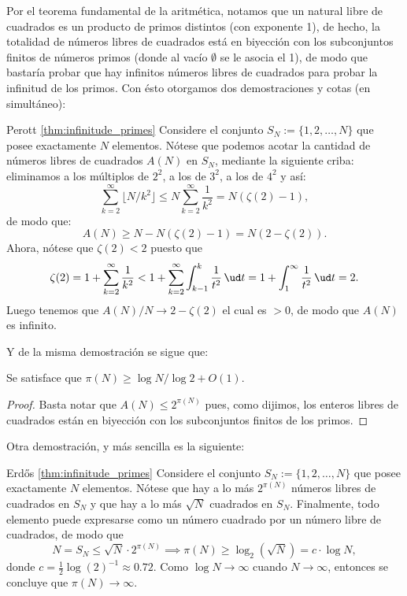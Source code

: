 \documentclass[teoria-numeros.tex]{subfiles}
\begin{document}
Por el teorema fundamental de la aritmética, notamos que un natural libre de cuadrados es un producto de primos distintos (con exponente 1),
de hecho, la totalidad de números libres de cuadrados está en biyección con los subconjuntos finitos de números primos (donde al vacío $\emptyset$
se le asocia el 1), de modo que bastaría probar que hay infinitos números libres de cuadrados para probar la infinitud de los primos.
Con ésto otorgamos dos demostraciones y cotas (en simultáneo):
\begin{Proof}{Perott \ref{thm:infinitude_primes}}
	Considere el conjunto $S_N := \{1, 2, \dots, N\}$ que posee exactamente $N$ elementos.
	Nótese que podemos acotar la cantidad de números libres de cuadrados $A(N)$ en $S_N$, mediante la siguiente criba:
	eliminamos a los múltiplos de $2^2$, a los de $3^2$, a los de $4^2$ y así:
	$$ \sum_{k=2}^{\infty} \lfloor N/k^2 \rfloor \le N \sum_{k=2}^{\infty} \frac{1}{k^2} = N( \zeta(2) - 1 ),  $$
	de modo que:
	$$ A(N) \ge N - N(\zeta(2) - 1) = N(2 - \zeta(2)). $$
	Ahora, nótese que $\zeta(2) < 2$ puesto que
	$$ \zeta(2) = 1 + \sum_{k=2}^{\infty} \frac{1}{k^2} < 1 + \sum_{k=2}^{\infty} \int_{k-1}^{k} \frac{1}{t^2} \, \ud t
	= 1 + \int_{1}^{\infty} \frac{1}{t^2} \, \ud t = 2. $$
	Luego tenemos que $A(N)/N \to 2 - \zeta(2)$ el cual es $>0$, de modo que $A(N)$ es infinito.
\end{Proof}

Y de la misma demostración se sigue que:
\begin{cor}
	Se satisface que $\pi(N) \ge \log N / \log 2 + O(1)$.
\end{cor}
\begin{proof}
	Basta notar que $A(N) \le 2^{\pi(N)}$ pues, como dijimos, los enteros libres de cuadrados están en biyección con los subconjuntos finitos de los primos.
\end{proof}

Otra demostración, y más sencilla es la siguiente:
\begin{Proof}{{Erd\H os \ref{thm:infinitude_primes}}}
	Considere el conjunto $S_N := \{1, 2, \dots, N\}$ que posee exactamente $N$ elementos.
	Nótese que hay a lo más $2^{\pi(N)}$ números libres de cuadrados en $S_N$ y que hay a lo más $\sqrt{N}$ cuadrados en $S_N$.
	Finalmente, todo elemento puede expresarse como un número cuadrado por un número libre de cuadrados, de modo que
	$$ N = S_N \le \sqrt{N} \cdot 2^{\pi(N)} \implies \pi(N) \ge \log_2(\sqrt{N}) = c\cdot\log N, $$
	donde $c = \frac{1}{2}\log(2)^{-1} \approx 0.72$.
	Como $\log N \to \infty$ cuando $N \to \infty$, entonces se concluye que $\pi(N) \to \infty$.
\end{Proof}
\end{document}
